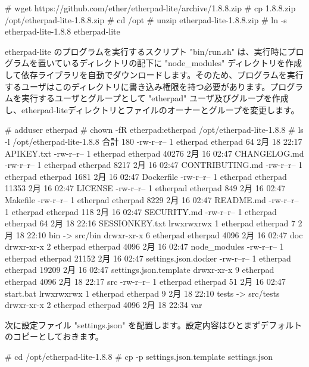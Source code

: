 \documentclass[mingoth,a4paper]{jsarticle}
\begin{document}
\begin{commandline}
# wget https://github.com/ether/etherpad-lite/archive/1.8.8.zip
# cp 1.8.8.zip /opt/etherpad-lite-1.8.8.zip
# cd /opt
# unzip etherpad-lite-1.8.8.zip
# ln -s etherpad-lite-1.8.8 etherpad-lite  
\end{commandline}

etherpad-lite のプログラムを実行するスクリプト "bin/run.sh" は、実行時にプログラムを置いているディレクトリの配下に "node\_modules" ディレクトリを作成して依存ライブラリを自動でダウンロードします。そのため、プログラムを実行するユーザはこのディレクトリに書き込み権限を持つ必要があります。プログラムを実行するユーザとグループとして "etherpad" ユーザ及びグループを作成し、etherpad-liteディレクトリとファイルのオーナーとグループを変更します。

\begin{commandline}
# adduser etherpad
# chown -fR etherpad:etherpad /opt/etherpad-lite-1.8.8
# ls -l /opt/etherpad-lite-1.8.8
合計 180
-rw-r--r-- 1 etherpad etherpad    64  2月 18 22:17 APIKEY.txt
-rw-r--r-- 1 etherpad etherpad 40276  2月 16 02:47 CHANGELOG.md
-rw-r--r-- 1 etherpad etherpad  8217  2月 16 02:47 CONTRIBUTING.md
-rw-r--r-- 1 etherpad etherpad  1681  2月 16 02:47 Dockerfile
-rw-r--r-- 1 etherpad etherpad 11353  2月 16 02:47 LICENSE
-rw-r--r-- 1 etherpad etherpad   849  2月 16 02:47 Makefile
-rw-r--r-- 1 etherpad etherpad  8229  2月 16 02:47 README.md
-rw-r--r-- 1 etherpad etherpad   118  2月 16 02:47 SECURITY.md
-rw-r--r-- 1 etherpad etherpad    64  2月 18 22:16 SESSIONKEY.txt
lrwxrwxrwx 1 etherpad etherpad     7  2月 18 22:10 bin -> src/bin
drwxr-xr-x 6 etherpad etherpad  4096  2月 16 02:47 doc
drwxr-xr-x 2 etherpad etherpad  4096  2月 16 02:47 node_modules
-rw-r--r-- 1 etherpad etherpad 21152  2月 16 02:47 settings.json.docker
-rw-r--r-- 1 etherpad etherpad 19209  2月 16 02:47 settings.json.template
drwxr-xr-x 9 etherpad etherpad  4096  2月 18 22:17 src
-rw-r--r-- 1 etherpad etherpad    51  2月 16 02:47 start.bat
lrwxrwxrwx 1 etherpad etherpad     9  2月 18 22:10 tests -> src/tests
drwxr-xr-x 2 etherpad etherpad  4096  2月 18 22:34 var
\end{commandline}

次に設定ファイル "settings.json" を配置します。設定内容はひとまずデフォルトのコピーとしておきます。

\begin{commandline}
# cd /opt/etherpad-lite-1.8.8
# cp -p settings.json.template settings.json
\end{commandline}
\end{document}
